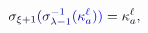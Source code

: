 \documentclass[12pt]{article}
\begin{document}
\makeatletter
\renewcommand*{\@textcolor}[3]{%
  \protect\leavevmode
  \begingroup
    \color#1{#2}#3%
  \endgroup
}
\makeatother
\begin{displaymath}
\mathcolor[RGB]{0,0,15}{\sigma} _ { \mathcolor[RGB]{0,0,30}{\xi} \mathcolor[RGB]{0,0,45}{+} \mathcolor[RGB]{0,0,60}{1} } \mathcolor[RGB]{0,0,75}{(} \mathcolor[RGB]{0,0,90}{\sigma} _ { \mathcolor[RGB]{0,0,105}{\lambda} \mathcolor[RGB]{0,0,120}{-} \mathcolor[RGB]{0,0,135}{1} } ^ { \mathcolor[RGB]{0,0,150}{-} \mathcolor[RGB]{0,0,165}{1} } \mathcolor[RGB]{0,0,180}{(} \mathcolor[RGB]{0,0,195}{\kappa} _ { \mathcolor[RGB]{0,0,210}{a} } ^ { \mathcolor[RGB]{0,0,225}{\ell} } \mathcolor[RGB]{0,0,240}{)} \mathcolor[RGB]{0,0,255}{)} \mathcolor[RGB]{0,15,0}{=} \mathcolor[RGB]{0,15,15}{\kappa} _ { \mathcolor[RGB]{0,15,30}{a} } ^ { \mathcolor[RGB]{0,15,45}{\ell} } \mathcolor[RGB]{0,15,60}{,}
\end{displaymath}
\end{document}
